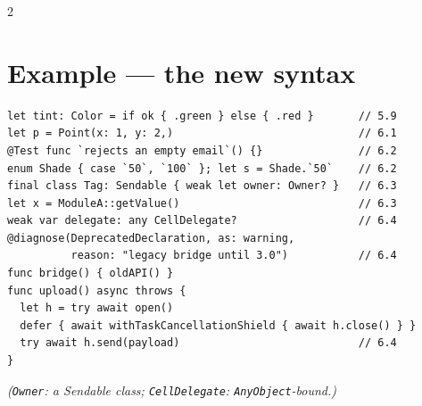 \documentclass[8pt]{extarticle}
\begin{document}
\begin{multicols}{2}
\section{Example — the new syntax}
\begin{lstlisting}[language=SwiftSheet]
let tint: Color = if ok { .green } else { .red }       // 5.9
let p = Point(x: 1, y: 2,)                             // 6.1
@Test func `rejects an empty email`() {}               // 6.2
enum Shade { case `50`, `100` }; let s = Shade.`50`    // 6.2
final class Tag: Sendable { weak let owner: Owner? }   // 6.3
let x = ModuleA::getValue()                            // 6.3
weak var delegate: any CellDelegate?                   // 6.4
@diagnose(DeprecatedDeclaration, as: warning,
          reason: "legacy bridge until 3.0")           // 6.4
func bridge() { oldAPI() }
func upload() async throws {
  let h = try await open()
  defer { await withTaskCancellationShield { await h.close() } }
  try await h.send(payload)                            // 6.4
}
\end{lstlisting}
{\footnotesize\itshape\color{sheetBrown} (\texttt{Owner}: a Sendable class;
\texttt{CellDelegate}: \texttt{AnyObject}-bound.)}

\end{multicols}
\end{document}
